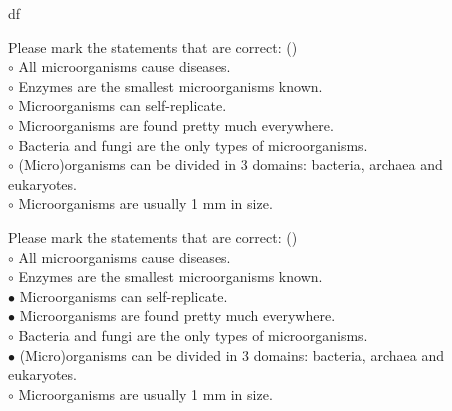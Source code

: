 df\documentclass[]{beamer}
\begin{document}
\begin{CJK}{UTF8}{gbsn}
\begin{frame}[shrink] {}
\addtocounter{questions}{1}
\color{blue}
Please mark the statements that are correct:
({})\\
\color{black}
\setlength{\parindent}{-0.4cm}
{\color{red}$\circ$} All microorganisms cause diseases.  \\
{\color{red}$\circ$} Enzymes are the smallest microorganisms known.   \\
{\color{red}$\circ$}  Microorganisms can self-replicate.  \\
{\color{red}$\circ$}  Microorganisms are found pretty much everywhere.  \\
{\color{red}$\circ$} Bacteria and fungi are the only types of microorganisms.  \\
{\color{red}$\circ$}  (Micro)organisms can be divided in 3 domains: bacteria, archaea and eukaryotes.  \\
{\color{red}$\circ$} Microorganisms are usually 1 mm in size.  \\
\end{frame}
\begin{frame}[shrink] {}
\addtocounter{answers}{1}
\color{blue}
Please mark the statements that are correct:
({})\\
\color{black}
\setlength{\parindent}{-0.4cm}
{\color{red}$\circ$} All microorganisms cause diseases.  \\
{\color{red}$\circ$} Enzymes are the smallest microorganisms known.   \\
{\color{red}$\bullet$} Microorganisms can self-replicate.  \\
{\color{red}$\bullet$} Microorganisms are found pretty much everywhere.  \\
{\color{red}$\circ$} Bacteria and fungi are the only types of microorganisms.  \\
{\color{red}$\bullet$} (Micro)organisms can be divided in 3 domains: bacteria, archaea and eukaryotes.  \\
{\color{red}$\circ$} Microorganisms are usually 1 mm in size.  \\
\end{frame}



\end{CJK}
\end{document}
